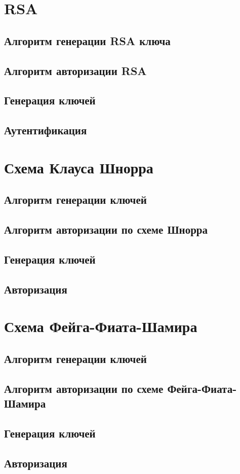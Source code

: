 \documentclass{article}
\begin{document}
\section{RSA}
\subsection{Алгоритм генерации RSA ключа}
\subsection{Алгоритм авторизации RSA}
\subsection{Генерация ключей}
\subsection{Аутентификация}

\section{Схема Клауса Шнорра}
\subsection{Алгоритм генерации ключей}
\subsection{Алгоритм авторизации по схеме Шнорра}
\subsection{Генерация ключей}
\subsection{Авторизация}

\section{Схема Фейга-Фиата-Шамира}
\subsection{Алгоритм генерации ключей}
\subsection{Алгоритм авторизации по схеме Фейга-Фиата-Шамира}
\subsection{Генерация ключей}
\subsection{Авторизация}
\end{document}
